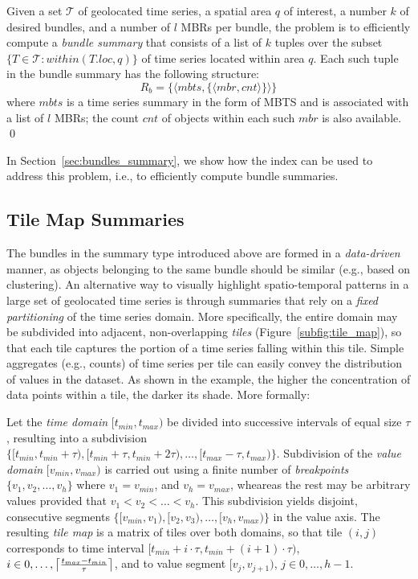 \begin{problem} 
Given a set $\mathcal{T}$ of geolocated time series, a spatial area $q$ of interest, a number $k$ of desired bundles, and a number of $l$ MBRs per bundle, the problem is to efficiently compute a {\em bundle summary} that consists of a list of $k$ tuples over the subset $\{ T \in \mathcal{T} : within(T.loc, q) \}$ of time series located within area $q$. Each such tuple in the bundle summary has the following structure:
\begin{equation} \label{eq:bundles_sum}
R_b = \{ \langle mbts, \{\langle mbr, cnt \rangle \}\rangle\}
\end{equation}
\noindent where $mbts$ is a time series summary in the form of MBTS and is associated with a list of $l$ MBRs; the count $cnt$ of objects within each such $mbr$ is also available.
\qed
\end{problem}

In Section~\ref{sec:bundles_summary}, we show how the \btsr index can be used to address this problem, i.e., to efficiently compute bundle summaries.

\subsection{Tile Map Summaries} 
\label{subsec:tilemap_sums}

The bundles in the summary type introduced above are formed in a {\em data-driven} manner, as objects belonging to the same bundle should be similar (e.g., based on clustering). An alternative way to visually highlight spatio-temporal patterns in a large set of geolocated time series is through summaries that rely on a {\em fixed partitioning} of the time series domain. More specifically, the entire domain may be subdivided into adjacent, non-overlapping {\em tiles} (Figure~\ref{subfig:tile_map}), so that each tile captures the portion of a time series falling within this tile. Simple aggregates (e.g., counts) of time series per tile can easily convey the distribution of values in the dataset. As shown in the example, the higher the concentration of data points within a tile, the darker its shade. More formally:

\begin{mydefinition} 
Let the {\em time domain} $[t_{min}, t_{max})$ be divided into successive intervals of equal size $\tau$, resulting into a subdivision $\{[t_{min}, t_{min}+\tau), [t_{min}+\tau, t_{min}+2\tau), \dots, [t_{max}-\tau, t_{max})\}$. Subdivision of the {\em value domain} $[v_{min}, v_{max})$ is carried out using a finite number of {\em breakpoints} $\{v_1, v_2, \dots, v_h\}$ where $v_1 = v_{min}$, and $v_h = v_{max}$, wheareas the rest may be arbitrary values provided that $v_1 < v_2 < \dots < v_h$. This subdivision yields disjoint, consecutive segments $\{[v_{min}, v_1), [v_2, v_3), \dots, [v_h, v_{max})\}$ in the value axis. The resulting {\em tile map} is a matrix of tiles over both domains, so that tile $(i,j)$ corresponds to time interval $[t_{min}+i\cdot\tau, t_{min}+(i+1)\cdot\tau)$, $i \in {0,\dots,\ceil*{\frac{t_{max}-t_{min}}{\tau}}}$, and to value segment $[v_j, v_{j+1})$, $j \in {0, \dots, h-1}$.
\end{mydefinition}

